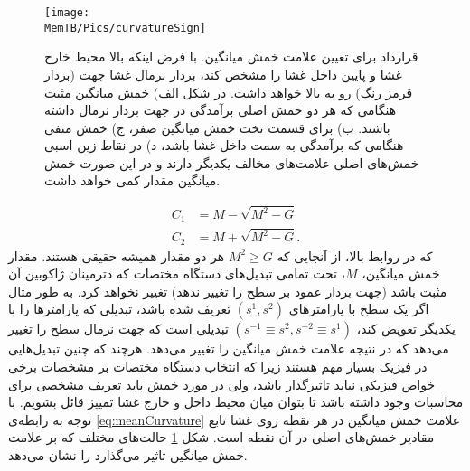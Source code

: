 \begin{figure}[h]
\begin{center}
\texttt{[image: \\MemTB/Pics/curvatureSign]}
\caption{
قرارداد برای تعیین علامت خمش میانگین. با فرض اینکه بالا محیط خارج غشا و پایین داخل غشا را مشخص کند، بردار نرمال غشا جهت (بردار قرمز رنگ) رو به بالا خواهد داشت. در شکل الف) خمش میانگین مثبت هنگامی که هر دو خمش اصلی برآمدگی در جهت بردار نرمال داشته باشند. ب) برای قسمت تخت خمش میانگین صفر، ج) خمش منفی هنگامی که  برآمدگی به سمت داخل غشا باشد، د) در نقاط زین اسبی خمش‌های اصلی علامت‌های مخالف یکدیگر دارند و در این صورت خمش میانگین مقدار کمی خواهد داشت.
}
\label{fig:curvatureSign}
\end{center}
\end{figure}

\begin{equation}
\begin{aligned}
C_1&=M-\sqrt{M^2-G}\\
C_2&=M+\sqrt{M^2-G}.
\label{eq:gaussianCurv}
\end{aligned}
\end{equation}
که در روابط بالا، از آنجایی که 
$M^2\geq G$
\cite{Seifert1991}
 هر دو مقدار همیشه حقیقی هستند. مقدار خمش میانگین، 
 $M$،
 تحت تمامی تبدیل‌های دستگاه مختصات که دترمینان ژاکوبین آن مثبت باشد (جهت بردار عمود بر سطح را تغییر ندهد) تغییر نخواهد کرد. به طور مثال اگر یک سطح با پارامتر‌های 
 $(s^1,s^2)$
 تعریف شده باشد، تبدیلی که پارامتر‌ها را با یکدیگر تعویض کند، 
 $(s^{-1}\equiv s^2,s^{-2}\equiv s^1)$
 تبدیلی است که جهت نرمال سطح را تغییر می‌دهد که در نتیجه علامت خمش میانگین را تغییر می‌دهد. هرچند که چنین تبدیل‌هایی در فیزیک بسیار مهم هستند زیرا که انتخاب دستگاه مختصات بر مشخصات برخی خواص فیزیکی نباید تاثیرگذار باشد، ولی در مورد خمش باید تعریف مشخصی برای محاسبات وجود داشته باشد تا بتوان میان محیط داخل و خارج غشا تمییز قائل بشویم. با توجه به رابطه‌ی
 \ref{eq:meanCurvature}
 علامت خمش میانگین در هر نقطه روی غشا تابع مقادیر خمش‌های اصلی در آن نقطه‌ است. شکل 
 \ref{fig:curvatureSign}
 حالت‌های مختلف که بر علامت خمش میانگین تاثیر می‌گذارد را نشان می‌دهد. 

